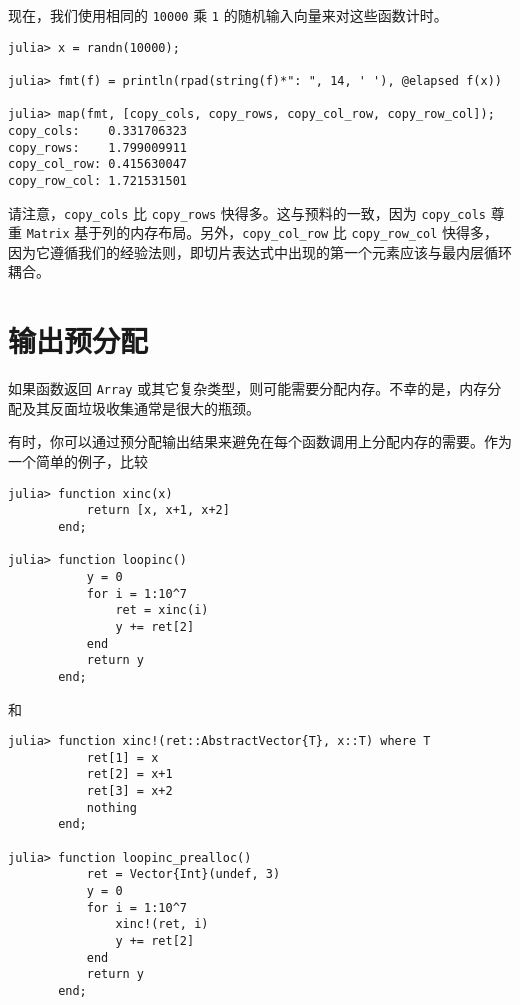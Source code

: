 现在，我们使用相同的 \texttt{10000} 乘 \texttt{1} 的随机输入向量来对这些函数计时。




\begin{verbatim}
julia> x = randn(10000);

julia> fmt(f) = println(rpad(string(f)*": ", 14, ' '), @elapsed f(x))

julia> map(fmt, [copy_cols, copy_rows, copy_col_row, copy_row_col]);
copy_cols:    0.331706323
copy_rows:    1.799009911
copy_col_row: 0.415630047
copy_row_col: 1.721531501
\end{verbatim}



请注意，\texttt{copy\_cols} 比 \texttt{copy\_rows} 快得多。这与预料的一致，因为 \texttt{copy\_cols} 尊重 \texttt{Matrix} 基于列的内存布局。另外，\texttt{copy\_col\_row} 比 \texttt{copy\_row\_col} 快得多，因为它遵循我们的经验法则，即切片表达式中出现的第一个元素应该与最内层循环耦合。



\hypertarget{9465526813695170184}{}


\section{输出预分配}



如果函数返回 \texttt{Array} 或其它复杂类型，则可能需要分配内存。不幸的是，内存分配及其反面垃圾收集通常是很大的瓶颈。



有时，你可以通过预分配输出结果来避免在每个函数调用上分配内存的需要。作为一个简单的例子，比较




\begin{verbatim}
julia> function xinc(x)
           return [x, x+1, x+2]
       end;

julia> function loopinc()
           y = 0
           for i = 1:10^7
               ret = xinc(i)
               y += ret[2]
           end
           return y
       end;
\end{verbatim}



和




\begin{verbatim}
julia> function xinc!(ret::AbstractVector{T}, x::T) where T
           ret[1] = x
           ret[2] = x+1
           ret[3] = x+2
           nothing
       end;

julia> function loopinc_prealloc()
           ret = Vector{Int}(undef, 3)
           y = 0
           for i = 1:10^7
               xinc!(ret, i)
               y += ret[2]
           end
           return y
       end;
\end{verbatim}



